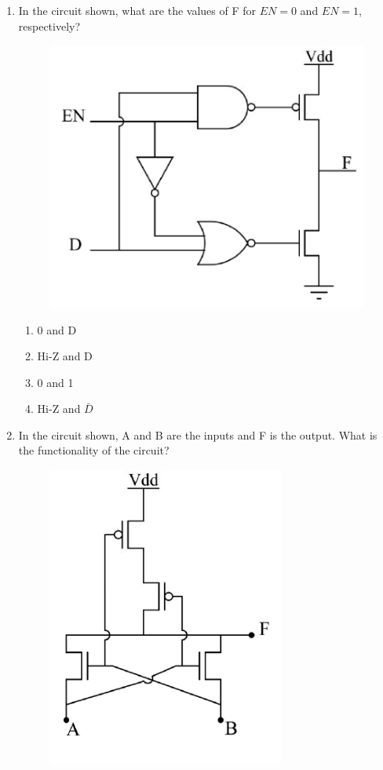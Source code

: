\documentclass[a4paper, 11pt]{article}
\begin{document}
\begin{enumerate}
    \hfill{}

    \item In the circuit shown, what are the values of F for $EN=0$ and $EN=1$, respectively?
    
    \begin{figure}[H]
        \centering
        \includegraphics[width=0.5\columnwidth]{figs/q14.png}
        \caption*{}
        \label{fig:q14}
    \end{figure}
    
    \begin{enumerate}
        \item 0 and D
        \item Hi-Z and D
        \item 0 and 1
        \item Hi-Z and $\bar{D}$
    \end{enumerate}
    
    \hfill{}
    
    \item In the circuit shown, A and B are the inputs and F is the output. What is the functionality of the circuit?
    
    \begin{figure}[H]
        \centering
        \includegraphics[width=0.3\columnwidth]{figs/q15.png}
        \caption*{}
        \label{fig:q15}
    \end{figure}


\end{enumerate}
\end{document}
